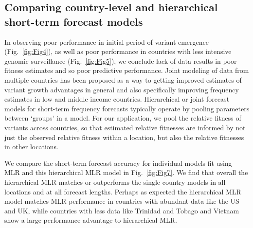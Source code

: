 \subsection*{Comparing country-level and hierarchical short-term forecast models}

In observing poor performance in initial period of variant emergence (Fig.~\ref{fig:Fig4}), as well as poor performance in countries with less intensive genomic surveillance (Fig.~\ref{fig:Fig5}), we conclude lack of data results in poor fitness estimates and so poor predictive performance.
Joint modeling of data from multiple countries has been proposed as a way to getting improved estimates of variant growth advantages in general and also specifically improving frequency estimates in low and middle income countries.
Hierarchical or joint forecast models for short-term frequency forecasts typically operate by pooling parameters between `groups' in a model.
For our application, we pool the relative fitness of variants across countries, so that estimated relative fitnesses are informed by not just the observed relative fitness within a location, but also the relative fitnesses in other locations.

We compare the short-term forecast accuracy for individual models fit using MLR and this hierarchical MLR model in Fig.~\ref{fig:Fig7}.
We find that overall the hierarchical MLR matches or outperforms the single country models in all locations and at all forecast lengths.
Perhaps as expected the hierarchical MLR model matches MLR performance in countries with abundant data like the US and UK, while countries with less data like Trinidad and Tobago and Vietnam show a large performance advantage to hierarchical MLR.


